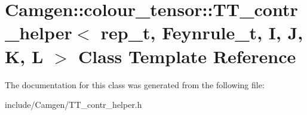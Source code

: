 \hypertarget{a00549}{}\section{Camgen\+:\+:colour\+\_\+tensor\+:\+:T\+T\+\_\+contr\+\_\+helper$<$ rep\+\_\+t, Feynrule\+\_\+t, I, J, K, L $>$ Class Template Reference}
\label{a00549}


The documentation for this class was generated from the following file\+:\begin{DoxyCompactItemize}
\item 
include/\+Camgen/T\+T\+\_\+contr\+\_\+helper.\+h\end{DoxyCompactItemize}
